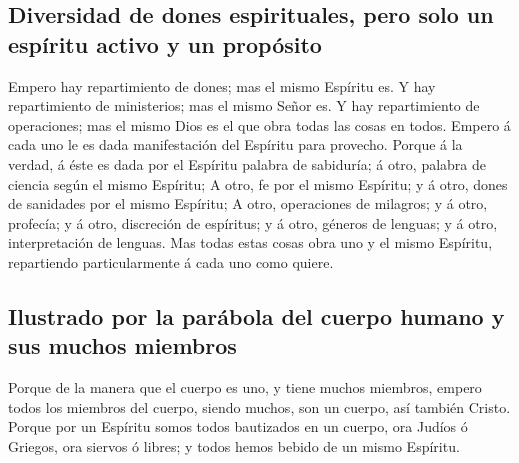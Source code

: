 \hypertarget{diversidad-de-dones-espirituales-pero-solo-un-espuxedritu-activo-y-un-propuxf3sito}{%
\subsection{Diversidad de dones espirituales, pero solo un espíritu
activo y un
propósito}\label{diversidad-de-dones-espirituales-pero-solo-un-espuxedritu-activo-y-un-propuxf3sito}}

 Empero hay repartimiento de dones; mas el mismo Espíritu
es.  Y hay repartimiento de ministerios; mas el mismo Señor
es.  Y hay repartimiento de operaciones; mas el mismo Dios
es el que obra todas las cosas en todos.  Empero á cada uno
le es dada manifestación del Espíritu para provecho.  Porque
á la verdad, á éste es dada por el Espíritu palabra de sabiduría; á
otro, palabra de ciencia según el mismo Espíritu;  A otro,
fe por el mismo Espíritu; y á otro, dones de sanidades por el mismo
Espíritu;  A otro, operaciones de milagros; y á otro,
profecía; y á otro, discreción de espíritus; y á otro, géneros de
lenguas; y á otro, interpretación de lenguas.  Mas todas
estas cosas obra uno y el mismo Espíritu, repartiendo particularmente á
cada uno como quiere.

\hypertarget{ilustrado-por-la-paruxe1bola-del-cuerpo-humano-y-sus-muchos-miembros}{%
\subsection{Ilustrado por la parábola del cuerpo humano y sus muchos
miembros}\label{ilustrado-por-la-paruxe1bola-del-cuerpo-humano-y-sus-muchos-miembros}}

 Porque de la manera que el cuerpo es uno, y tiene muchos
miembros, empero todos los miembros del cuerpo, siendo muchos, son un
cuerpo, así también Cristo.  Porque por un Espíritu somos
todos bautizados en un cuerpo, ora Judíos ó Griegos, ora siervos ó
libres; y todos hemos bebido de un mismo Espíritu.

